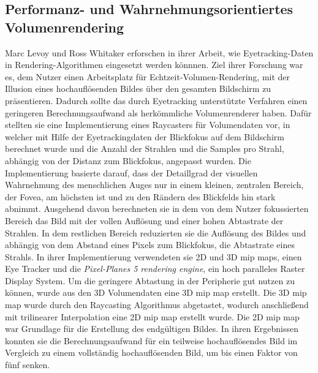 \subsection{Performanz- und Wahrnehmungsorientiertes Volumenrendering}\label{ss::pfwov}
Marc Levoy und Ross Whitaker \cite{Levoy:1990:GVR:91385.91449} erforschen in ihrer Arbeit, wie Eyetracking-Daten in Rendering-Algorithmen eingesetzt werden könnnen.
Ziel ihrer Forschung war es, dem Nutzer einen Arbeitsplatz für Echtzeit-Volumen-Rendering, mit der Illusion eines hochauflösenden Bildes über den gesamten Bildschirm zu präsentieren.
Dadurch sollte das durch Eyetracking unterstützte Verfahren einen geringeren Berechnungsaufwand als herkömmliche Volumenrenderer haben.
Dafür stellten sie eine Implementierung eines Raycasters für Volumendaten vor, in welcher mit Hilfe der Eyetrackingdaten der Blickfokus auf dem Bildschirm berechnet wurde und die Anzahl der Strahlen und die Samples pro Strahl, abhängig von der Distanz zum Blickfokus, angepasst wurden.
Die Implementierung basierte darauf, dass der Detaillgrad der visuellen Wahrnehmung des menschlichen Auges nur in einem kleinen, zentralen Bereich, der Fovea, am höchsten ist und zu den Rändern des Blickfelds hin stark abnimmt.
Ausgehend davon berechneten sie in dem von dem Nutzer fokussierten Bereich das Bild mit der vollen Auflösung und einer hohen Abtastrate der Strahlen.
In dem restlichen Bereich reduzierten sie die Auflösung des Bildes und abhängig von dem Abstand eines Pixels zum Blickfokus, die Abtastrate eines Strahls.
In ihrer Implementierung verwendeten sie 2D und 3D mip maps, einen Eye Tracker und die \emph{Pixel-Planes 5 rendering engine}, ein hoch paralleles Raster Display System.
Um die geringere Abtastung in der Peripherie gut nutzen zu können, wurde aus den 3D Volumendaten eine 3D mip map erstellt.
Die 3D mip map wurde durch den Raycasting Algorithmus abgetastet, wodurch anschließend mit trilinearer Interpolation eine 2D mip map erstellt wurde.
Die 2D mip map war Grundlage für die Erstellung des endgültigen Bildes.
In ihren Ergebnissen konnten sie die Berechnungsaufwand für ein teilweise hochauflösendes Bild im Vergleich zu einem vollständig hochauflösenden Bild, um bis einen Faktor von fünf senken.

